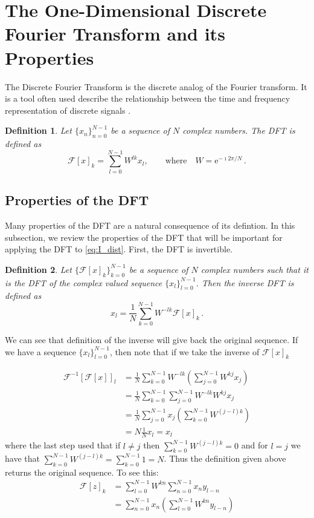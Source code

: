 \documentclass[12pt]{CSUNthesis}
\newtheorem{definition}{Definition}
\def\e{\mathrm{e}}
\def\calF{\mathcal{F}}
\begin{document}
\section{The One-Dimensional Discrete Fourier Transform and its Properties}

The Discrete Fourier Transform is the discrete analog of the Fourier transform. It is a tool often used describe the relationship between the time and frequency representation of discrete signals \cite{Nussbaumer1982}. 
\begin{definition}
Let $\{x_n\}_{n=0}^{N-1}$ be a sequence of $N$ complex numbers. The DFT is defined as
\begin{equation}
\label{eq:dft_1d}
\calF[x]_{k} =  \sum_{l=0}^{N-1} W^{lk} x_l, \qquad  
\mbox{where}\quad 
W=\e^{-\imath 2\pi/N}\, .
\end{equation}
\end{definition}

\subsection{Properties of the DFT}

Many properties of the DFT are a natural consequence of its defintion. In this subsection, we review the properties of the DFT that will be important for applying the DFT to \ref{eq:I_dist}. First, the DFT is invertible.

\begin{definition}
Let $\{\calF [x]_k\}_{k=0}^{N-1}$ be a sequence of $N$ complex numbers such that it is the DFT of the complex valued sequence $\{x_l\}_{l=0}^{N-1}$. Then the inverse DFT is defined as
\begin{equation}
\label{eq:idft_1d}
x_{l} = \frac{1}{N} \sum_{k=0}^{N-1} W^{-lk} \calF[x]_{k} \, .
\end{equation}
\end{definition}

We can see that definition of the inverse will give back the original sequence. If we have a sequence $\{x_l\}_{l=0}^{N-1}$, then note that if we take the inverse of $\calF[x]_k$

\begin{align*}
\calF^{-1}[\calF[x]]_l &= \frac{1}{N} \sum_{k=0}^{N-1}W^{-lk}(\sum_{j=0}^{N-1} W^{kj} x_j) \\
 &= \frac{1}{N} \sum_{k=0}^{N-1} \sum_{j=0}^{N-1} W^{-lk} W^{kj} x_j \\
 &= \frac{1}{N} \sum_{j=0}^{N-1}  x_j (\sum_{k=0}^{N-1} W^{(j-l)k}) \\
 &= N \frac{1}{N} x_l = x_l
\end{align*}
where the last step used that if $l \not = j$ then $\sum_{k=0}^{N-1} W^{(j-l)k} = 0$ and for $l=j$ we have that $\sum_{k=0}^{N-1} W^{(j-l)k} = \sum_{k=0}^{N-1} 1 = N$. Thus the definition given above returns the original sequence. To see this:
\begin{align*}
\calF[z]_k &= \sum_{l=0}^{N-1} W^{kn} \sum_{n=0}^{N-1} x_{n}y_{l-n} \\
&= \sum_{n=0}^{N-1} x_{n} ( \sum_{l=0}^{N-1} W^{kn}y_{l-n})
\end{align*}
\end{document}
